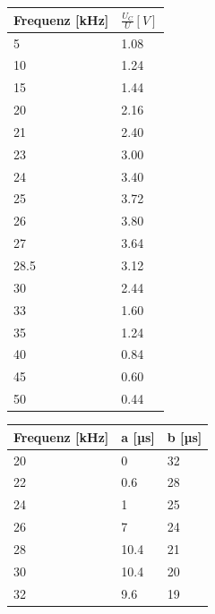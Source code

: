 \documentclass[titlepage=firstcover, captions=tableheading]{scrartcl}
\begin{document}
\begin{minipage}{\linewidth}
    \begin{table}[H]
        \centering
    
    \begin{tabular}{ll}
        \toprule
        Frequenz [kHz] & $\frac{U_C}{U} [V]$\\
        \midrule
        5     & 1.08 \\
        10    & 1.24 \\
        15    & 1.44 \\
        20    & 2.16 \\
        21    & 2.40 \\
        23    & 3.00 \\
        24    & 3.40 \\
        25    & 3.72 \\
        26    & 3.80 \\
        27    & 3.64 \\
        28.5  & 3.12 \\
        30    & 2.44 \\
        33    & 1.60 \\ 
        35    & 1.24 \\
        40    & 0.84 \\
        45    & 0.60 \\
        50    & 0.44 \\ 
        \bottomrule
        
    \end{tabular}
    \label{tab:5b}
    \end{table}
    \end{minipage}

    \begin{minipage}{\linewidth}
        \begin{table}[H]
            \centering
    \begin{tabular}{lll}
        \toprule
        Frequenz [kHz] & a [µs] & b [µs]\\
        \midrule
        20  &    0     &  32 \\
        22  &    0.6   &  28 \\
        24  &    1     &  25 \\
        26  &    7     &  24 \\
        28  &    10.4  &  21 \\
        30  &    10.4  &  20 \\
        32  &    9.6   &  19 \\ 
        \bottomrule
        
    \end{tabular}
    \label{tab:5d}
    \end{table}
\end{minipage}
\end{document}

